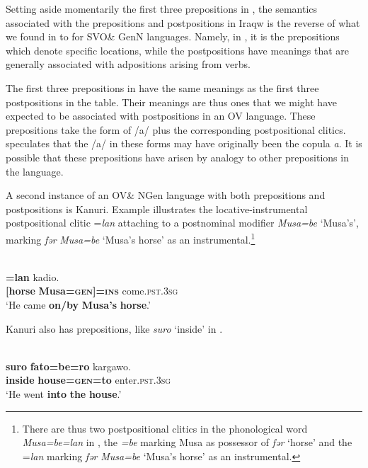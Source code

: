 \documentclass[output=paper]{langsci/langscibook}
\begin{document}
Setting aside momentarily the first three prepositions in , the semantics associated with the prepositions and postpositions in Iraqw is the reverse of what we found in  to  for SVO\& GenN languages. Namely, in , it is the prepositions which denote specific locations, while the postpositions have meanings that are generally associated with adpositions arising from verbs.

The first three prepositions in  have the same meanings as the first three postpositions in the table. Their meanings are thus ones that we might have expected to be associated with postpositions in an OV language. These prepositions take the form of /a/ plus the corresponding postpositional clitics. \citet[102]{Mous1993} speculates that the /a/ in these forms may have originally been the copula \textit{a}. It is possible that these prepositions have arisen by analogy to other prepositions in the language.

A second instance of an OV\& NGen language with both prepositions and postpositions is Kanuri. Example  illustrates the locative-instrumental postpositional clitic =\textit{lan} attaching to a postnominal modifier \textit{Musa=be} ‘Musa’s’, marking \textit{fər} \textit{Musa=be} ‘Musa’s horse’ as an instrumental.\footnote{There are thus two postpositional clitics in the phonological word \textit{Musa=be=lan} in , the \textit{=be} marking Musa as possessor of \textit{fər} ‘horse’ and the =\textit{lan} marking  \textit{fər} \textit{Musa=be} ‘Musa’s horse’ as an instrumental.}

\ea\label{ex:dryer:33}
\\
\gll [\textbf{fər}  \textbf{Musa=be}]\textbf{=lan}  kadio.\\
       \textbf{[horse}  \textbf{Musa=\textsc{gen]=ins}}  come.\textsc{pst.3sg}  \\
\glt ‘He came \textbf{on/by} \textbf{Musa’s} \textbf{horse}.’
\z

Kanuri also has prepositions, like \textit{suro} ‘inside’ in .

\ea\label{ex:dryer:34}
\\
\gll   \textbf{suro}  \textbf{fato=be=ro}  kargawo.\\
       \textbf{inside}  \textbf{house=\textsc{gen}}\textbf{=to}  enter.\textsc{pst.3sg}\\
\glt   ‘He went \textbf{into} \textbf{the} \textbf{house}.’
\z
\end{document}
